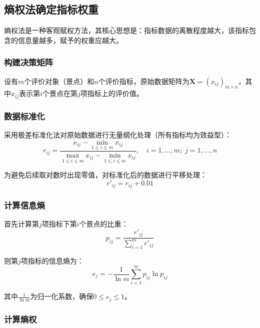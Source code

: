 \documentclass[12pt,a4paper]{ctexart}
\newcommand{\mat}[1]{\mathbf{#1}}
\begin{document}
\subsection{熵权法确定指标权重}

熵权法是一种客观赋权方法，其核心思想是：指标数据的离散程度越大，该指标包含的信息量越多，赋予的权重应越大。

\subsubsection{构建决策矩阵}

设有$m$个评价对象（景点）和$n$个评价指标，原始数据矩阵为$\mat{X} = (x_{ij})_{m \times n}$，其中$x_{ij}$表示第$i$个景点在第$j$项指标上的评价值。

\subsubsection{数据标准化}

采用极差标准化法对原始数据进行无量纲化处理（所有指标均为效益型）：
\begin{equation}
\label{eq:normalize}
r_{ij} = \frac{x_{ij} - \min_{1 \le i \le m} x_{ij}}{\max_{1 \le i \le m} x_{ij} - \min_{1 \le i \le m} x_{ij}}, \quad i=1,\ldots,m; \; j=1,\ldots,n
\end{equation}

为避免后续取对数时出现零值，对标准化后的数据进行平移处理：
\begin{equation}
r'_{ij} = r_{ij} + 0.01
\end{equation}

\subsubsection{计算信息熵}

首先计算第$j$项指标下第$i$个景点的比重：
\begin{equation}
\label{eq:proportion}
p_{ij} = \frac{r'_{ij}}{\sum_{i=1}^{m} r'_{ij}}
\end{equation}

则第$j$项指标的信息熵为：
\begin{equation}
\label{eq:entropy}
e_j = -\frac{1}{\ln m} \sum_{i=1}^{m} p_{ij} \ln p_{ij}
\end{equation}

其中$\frac{1}{\ln m}$为归一化系数，确保$0 \le e_j \le 1$。

\subsubsection{计算熵权}
\end{document}
